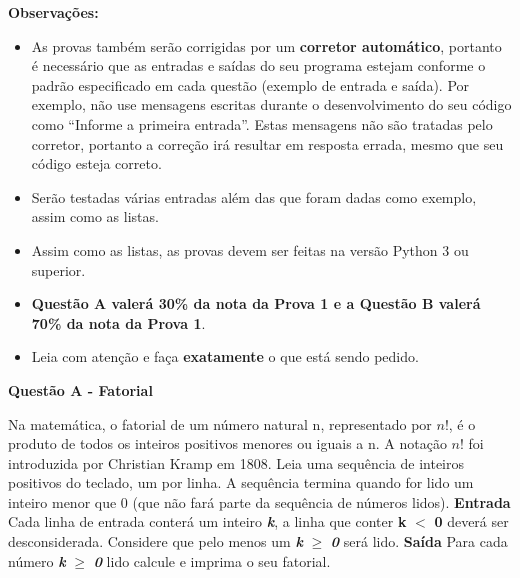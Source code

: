 \documentclass[a4paper, 12pt]{article}
\begin{document}
\textbf{{\large Observações:}}
\begin{itemize}
	\item As provas também serão corrigidas por um \textbf{corretor automático}, portanto é necessário que as entradas e saídas do seu programa estejam conforme o padrão especificado em cada questão (exemplo de entrada e saída). Por exemplo, não use mensagens escritas durante o desenvolvimento do seu código como “Informe a primeira entrada”. Estas mensagens não são tratadas pelo corretor, portanto a correção irá resultar em resposta errada, mesmo que seu código esteja correto.
	\item Serão testadas várias entradas além das que foram dadas como exemplo, assim como as listas.
	\item Assim como as listas, as provas devem ser feitas na versão Python 3 ou superior.
	\item \textbf{Questão A valerá 30\% da nota da Prova 1 e a Questão B valerá 70\% da nota da Prova 1}.
	\item Leia com atenção e faça \textbf{exatamente} o que está sendo pedido.
\end{itemize}
\newpage %
\begin{center}
\textbf{{\Large Questão A - Fatorial}}
\end{center}
\vspace{5pt}
Na matemática, o fatorial de um número natural n, representado por $n!$, é o produto de todos os inteiros positivos menores ou iguais a n. A notação $n!$ foi introduzida por Christian Kramp em 1808. \newline \newline Leia uma sequência de inteiros positivos do teclado, um por linha. A sequência termina quando for lido um inteiro menor que 0 (que não fará parte da sequência de números lidos).
\newline \newline
\textbf{{\large Entrada}} \newline
Cada linha de entrada conterá um inteiro \textbf{\textit{k}}, a linha que conter \textbf{k} $<$ \textbf{0} deverá ser desconsiderada. Considere que pelo menos um \textbf{\textit{k}} $\geq$ \textbf{\textit{0}} será lido.
\newline \newline
\textbf{{\large Saída}} \newline
Para cada número \textbf{\textit{k}} $\geq$ \textbf{\textit{0}} lido calcule e imprima o seu fatorial.
\newline
\end{document}
